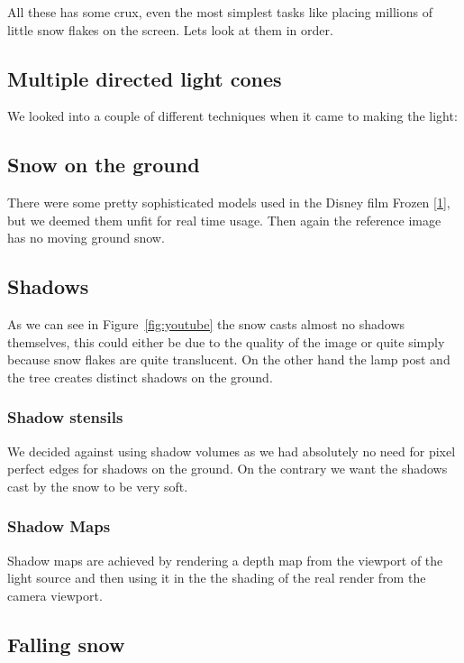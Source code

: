 \documentclass[a4paper,12pt]{article}
\begin{document}
All these has some crux, even the most simplest tasks like placing millions of little snow flakes on the screen. Lets look at them in order.


\subsection{Multiple directed light cones}

We looked into a couple of different techniques when it came to making the light:


\subsection{Snow on the ground}

There were some pretty sophisticated models used in the Disney film Frozen \href{https://disney-animation.s3.amazonaws.com/uploads/production/publication_asset/94/asset/SSCTS13_2.pdf}{[1]}, but we deemed them unfit for real time usage. Then again the reference image has no moving ground snow.


\subsection{Shadows}

As we can see in Figure~\ref{fig:youtube} the snow casts almost no shadows themselves, this could either be due to the quality of the image or quite simply because snow flakes are quite translucent. On the other hand the lamp post and the tree creates distinct shadows on the ground.


\subsubsection{Shadow stensils}

We decided against using shadow volumes as we had absolutely no need for pixel perfect edges for shadows on the ground. On the contrary we want the shadows cast by the snow to be very soft.

\subsubsection{Shadow Maps}

Shadow maps are achieved by rendering a depth map from the viewport of the light source and then using it in the the shading of the real render from the camera viewport.


\subsection{Falling snow}
\end{document}
